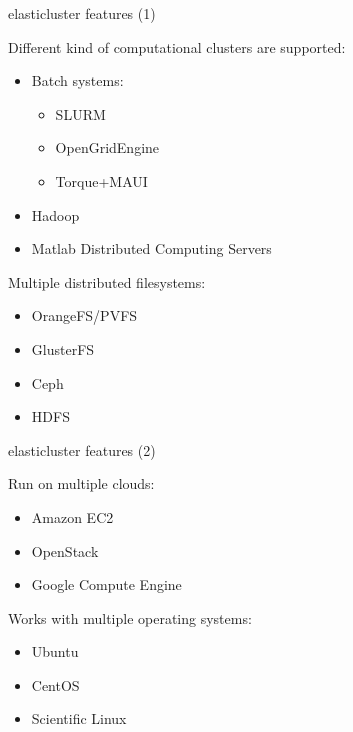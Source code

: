 \documentclass[english,serif,mathserif,usenames,dvipsnames]{beamer}
\begin{document}
\begin{frame}
  {elasticluster features (1)}

  Different kind of computational clusters are supported:

  \begin{itemize}
    \item Batch systems:
      \begin{itemize}
      \item SLURM
      \item OpenGridEngine
      \item Torque+MAUI
      \end{itemize}
    \item Hadoop
    \item Matlab Distributed Computing Servers
    \end{itemize}

  \+
  \pause
  Multiple distributed filesystems:

  \begin{itemize}
  \item OrangeFS/PVFS
  \item GlusterFS
  \item Ceph
  \item HDFS
  \end{itemize}
\end{frame}

\begin{frame}
  {elasticluster features (2)}

  Run on multiple clouds:

  \begin{itemize}
  \item Amazon EC2
  \item OpenStack
  \item Google Compute Engine
  \end{itemize}

  \+

  Works with multiple operating systems:

  \begin{itemize}
  \item Ubuntu
  \item CentOS
  \item Scientific Linux
  \end{itemize}
\end{frame}
\end{document}
